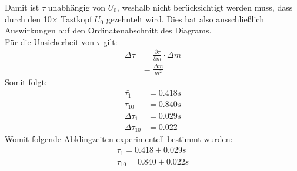 \documentclass{report}
\begin{document}
Damit ist $\tau$ unabhängig von $U_0$, weshalb nicht berücksichtigt werden muss, dass durch den 10$\times$ Tastkopf $U_0$ gezehntelt wird. 
Dies hat also ausschließlich Auswirkungen auf den Ordinatenabschnitt des Diagrams. \\
Für die Unsicherheit von $\tau$ gilt:
\begin{equation}
    \begin{split}
        \Delta \tau &= \frac{\partial \tau}{\partial m} \cdot \Delta m \\
                    &= \frac{\Delta m}{m^2}
    \end{split}
\end{equation}
Somit folgt:
\begin{equation}
    \begin{split}
        \bar{\tau_1} &= 0.418 \si{s} \\
        \bar{\tau_{10}} &= 0.840 \si{s} \\
        \Delta \tau_1 &= 0.029 \si{s} \\
        \Delta \tau_{10} &= 0.022
    \end{split}
\end{equation}
Womit folgende Abklingzeiten experimentell bestimmt wurden:
\begin{equation}
    \begin{split}        
        \boxed{\tau_1 = 0.418 \pm 0.029 \si{s}} \\
        \boxed{\tau_{10} = 0.840 \pm 0.022 \si{s}}
    \end{split}
    \label{eq:experimentelleRelaxiationszeiten}
\end{equation}
\end{document}
